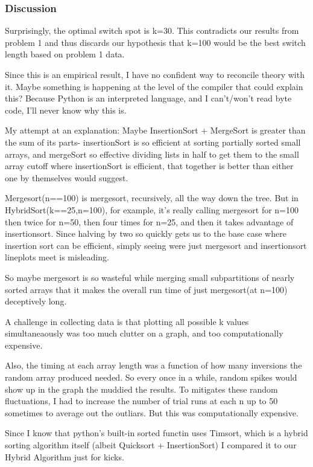 \documentclass[11pt]{article}
\begin{document}
    \subsubsection{Discussion}\label{discussion}

Surprisingly, the optimal switch spot is k=30. This contradicts our
results from problem 1 and thus discards our hypothesis that k=100 would
be the best switch length based on problem 1 data.

Since this is an empirical result, I have no confident way to reconcile
theory with it. Maybe something is happening at the level of the
compiler that could explain this? Because Python is an interpreted
language, and I can't/won't read byte code, I'll never know why this is.

My attempt at an explanation: Maybe InsertionSort + MergeSort is greater
than the sum of its parts- insertionSort is so efficient at sorting
partially sorted small arrays, and mergeSort so effective dividing lists
in half to get them to the small array cutoff where insertionSort is
efficient, that together is better than either one by themselves would
suggest.

Mergesort(n==100) is mergesort, recursively, all the way down the tree.
But in HybridSort(k==25,n=100), for example, it's really calling
mergesort for n=100 then twice for n=50, then four times for n=25, and
then it takes advantage of insertionsort. Since halving by two so
quickly gets us to the base case where insertion sort can be efficient,
simply seeing were just mergesort and insertionsort lineplots meet is
misleading.

So maybe mergesort is so wasteful while merging small subpartitions of
nearly sorted arrays that it makes the overall run time of just
mergesort(at n=100) deceptively long.

A challenge in collecting data is that plotting all possible k values
simultaneaously was too much clutter on a graph, and too computationally
expensive.

Also, the timing at each array length was a function of how many
inversions the random array produced needed. So every once in a while,
random spikes would show up in the graph the muddied the results. To
mitigates these random fluctuations, I had to increase the number of
trial runs at each n up to 50 sometimes to average out the outliars. But
this was computationally expensive.

Since I know that python's built-in sorted functin uses Timsort, which
is a hybrid sorting algorithm itself (albeit Quicksort + InsertionSort)
I compared it to our Hybrid Algorithm just for kicks.
\end{document}
